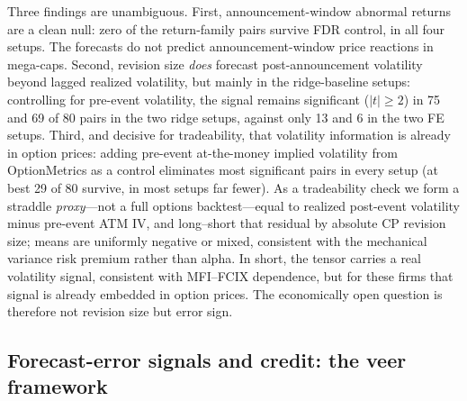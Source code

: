 \documentclass[pdflatex,sn-mathphys-num]{sn-jnl}%
\theoremstyle{thmstyleone}%
\theoremstyle{thmstyletwo}%
\theoremstyle{thmstylethree}%
\begin{document}
Three findings are unambiguous. First, announcement-window abnormal returns are a clean null: zero of the return-family pairs survive FDR control, in all four setups. The forecasts do not predict announcement-window price reactions in mega-caps. Second, revision size \emph{does} forecast post-announcement volatility beyond lagged realized volatility, but mainly in the ridge-baseline setups: controlling for pre-event volatility, the signal remains significant ($|t| \geq 2$) in 75 and 69 of 80 pairs in the two ridge setups, against only 13 and 6 in the two FE setups. Third, and decisive for tradeability, that volatility information is already in option prices: adding pre-event at-the-money implied volatility from OptionMetrics as a control eliminates most significant pairs in every setup (at best 29 of 80 survive, in most setups far fewer). As a tradeability check we form a straddle \emph{proxy}---not a full options backtest---equal to realized post-event volatility minus pre-event ATM IV, and long--short that residual by absolute CP revision size; means are uniformly negative or mixed, consistent with the mechanical variance risk premium rather than alpha. In short, the tensor carries a real volatility signal, consistent with MFI--FCIX dependence, but for these firms that signal is already embedded in option prices. The economically open question is therefore not revision size but error sign.

\subsection{Forecast-error signals and credit: the veer framework}
\label{Section:Veer}
\end{document}
